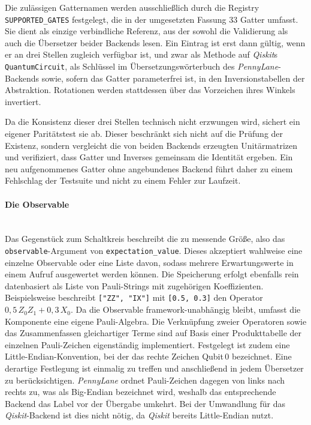 Die zulässigen Gatternamen werden ausschließlich durch die Registry
\texttt{SUPPORTED\_GATES} festgelegt, die in der umgesetzten Fassung 33 Gatter
umfasst. Sie dient als einzige verbindliche Referenz, aus der sowohl die
Validierung als auch die Übersetzer beider Backends lesen. Ein Eintrag ist erst
dann gültig, wenn er an drei Stellen zugleich verfügbar ist, und zwar als
Methode auf \textit{Qiskit}s \texttt{QuantumCircuit}, als Schlüssel im
Übersetzungswörterbuch des \textit{PennyLane}-Backends sowie, sofern das Gatter
parameterfrei ist, in den Inversionstabellen der Abstraktion. Rotationen werden
stattdessen über das Vorzeichen ihres Winkels invertiert.

Da die Konsistenz dieser drei Stellen technisch nicht erzwungen wird, sichert
ein eigener Paritätstest sie ab. Dieser beschränkt sich nicht auf die Prüfung
der Existenz, sondern vergleicht die von beiden Backends erzeugten
Unitärmatrizen und verifiziert, dass Gatter und Inverses gemeinsam die Identität
ergeben. Ein neu aufgenommenes Gatter ohne angebundenes Backend führt daher zu
einem Fehlschlag der Testsuite und nicht zu einem Fehler zur Laufzeit.

\paragraph*{Die Observable}\mbox{}\\
\label{par:datentypen-observable}
Das Gegenstück zum Schaltkreis beschreibt die zu messende Größe, also das
\texttt{observable}-Argument von \texttt{expectation\_value}. Dieses akzeptiert
wahlweise eine einzelne Observable oder eine Liste davon, sodass mehrere
Erwartungswerte in einem Aufruf ausgewertet werden können. Die Speicherung
erfolgt ebenfalls rein datenbasiert als Liste von Pauli-Strings mit zugehörigen
Koeffizienten. Beispielsweise beschreibt \verb|["ZZ", "IX"]| mit \verb|[0.5, 0.3]| den Operator $0{,}5\,Z_0Z_1 + 0{,}3\,X_0$. Da die Observable
framework-unabhängig bleibt, umfasst die Komponente eine eigene Pauli-Algebra.
Die Verknüpfung zweier Operatoren sowie das Zusammenfassen gleichartiger Terme
sind auf Basis einer Produkttabelle der einzelnen Pauli-Zeichen eigenständig
implementiert. Festgelegt ist zudem eine Little-Endian-Konvention, bei der das
rechte Zeichen Qubit\,0 bezeichnet. Eine derartige Festlegung ist einmalig zu treffen und anschließend
in jedem Übersetzer zu berücksichtigen. \textit{PennyLane} ordnet Pauli-Zeichen
dagegen von links nach rechts zu, was als Big-Endian bezeichnet wird, weshalb das
entsprechende Backend das Label vor der Übergabe umkehrt. Bei der Umwandlung für
das \textit{Qiskit}-Backend ist dies nicht nötig, da \textit{Qiskit} bereits
Little-Endian nutzt.

